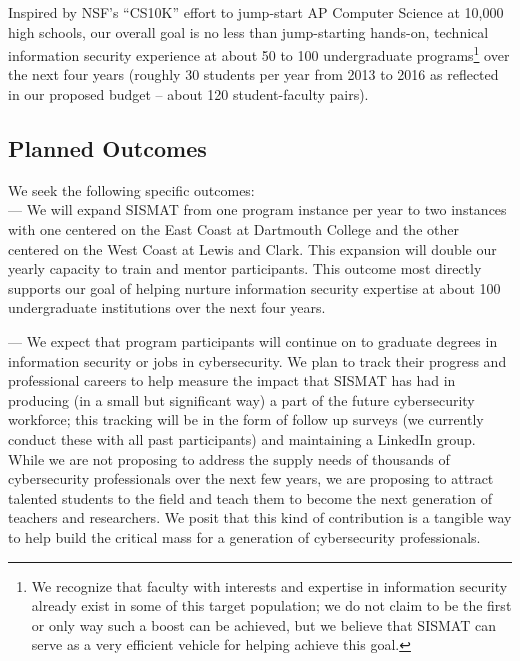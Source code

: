 Inspired by NSF's ``CS10K'' effort to jump-start AP Computer Science
at 10,000 high schools, our overall goal is no less than jump-starting
hands-on, technical information security experience at about 50 to 100
undergraduate programs\footnote{We recognize that faculty with
  interests and expertise in information security already exist in
  some of this target population; we do not claim to be the first or
  only way such a boost can be achieved, but we believe that SISMAT
  can serve as a very efficient vehicle for helping achieve this
  goal.} over the next four years (roughly 30 students per year
from 2013 to 2016 as reflected in our proposed budget -- about 120
student-faculty pairs).

\subsection{Planned Outcomes}
\label{ssec:outcomes}

We seek the following specific outcomes:\\

 --- We
will expand SISMAT from one program instance per year to two instances
with one centered on the East Coast at Dartmouth College and the other
centered on the West Coast at Lewis and Clark.  This expansion will
double our yearly capacity to train and mentor participants.  This
outcome most directly supports our goal of helping nurture information
security expertise at about 100 undergraduate institutions over the
next four years.

 --- We expect that
program participants will continue on to graduate degrees in
information security or jobs in cybersecurity.  We plan to track their
progress and professional careers to help measure the impact that
SISMAT has had in producing (in a small but significant way) a part of
the future cybersecurity workforce; this tracking will be in the form
of follow up surveys (we currently conduct these with all past
participants) and maintaining a LinkedIn group.  While we are not
proposing to address the supply needs of thousands of cybersecurity
professionals over the next few years, we are proposing to attract
talented students to the field and teach them to become the next
generation of teachers and researchers.  We posit that this kind of
contribution is a tangible way to help build the critical mass for a
generation of cybersecurity professionals.

